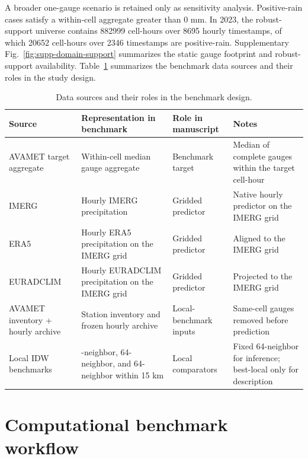 \documentclass[preprint,12pt]{elsarticle}
\begin{document}
A broader one-gauge scenario is retained only as sensitivity analysis. Positive-rain cases satisfy a within-cell aggregate greater than 0 mm. In 2023, the robust-support universe contains 882999 cell-hours over 8695 hourly timestamps, of which 20652 cell-hours over 2346 timestamps are positive-rain. Supplementary Fig.~\ref{fig:supp-domain-support} summarizes the static gauge footprint and robust-support availability. Table~\ref{tab:data-sources} summarizes the benchmark data sources and their roles in the study design.

\begin{table}[t]
\centering
\begin{threeparttable}
\caption{Data sources and their roles in the benchmark design.}
\label{tab:data-sources}
\footnotesize
\begin{tabularx}{\textwidth}{>{\raggedright\arraybackslash}p{2.5cm} >{\raggedright\arraybackslash}p{2.7cm} >{\raggedright\arraybackslash}p{2.3cm} X}
\toprule
Source & Representation in benchmark & Role in manuscript & Notes \\
\midrule
AVAMET target aggregate & Within-cell median gauge aggregate & Benchmark target & Median of complete gauges within the target cell-hour \\
IMERG & Hourly IMERG precipitation & Gridded predictor & Native hourly predictor on the IMERG grid \\
ERA5 & Hourly ERA5 precipitation on the IMERG grid & Gridded predictor & Aligned to the IMERG grid \\
EURADCLIM & Hourly EURADCLIM precipitation on the IMERG grid & Gridded predictor & Projected to the IMERG grid \\
AVAMET inventory + hourly archive & Station inventory and frozen hourly archive & Local-benchmark inputs & Same-cell gauges removed before prediction \\
Local IDW benchmarks & 8-neighbor, 64-neighbor, and 64-neighbor within 15 km & Local comparators & Fixed 64-neighbor for inference; best-local only for description \\
\bottomrule
\end{tabularx}
\end{threeparttable}
\end{table}


\clearpage
\section{Computational benchmark workflow}
\end{document}
